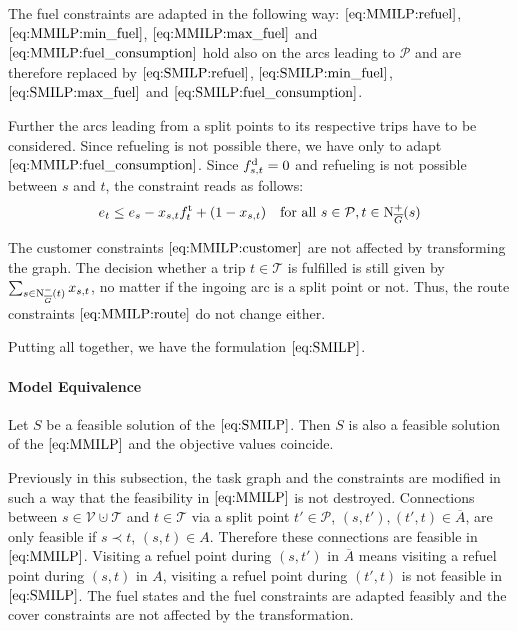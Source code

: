 The fuel constraints are adapted in the following way: $\eqref{eq:MMILP:refuel}$, $\eqref{eq:MMILP:min_fuel}$, $\eqref{eq:MMILP:max_fuel}$ and $\eqref{eq:MMILP:fuel_consumption}$ hold also on the arcs leading to $\mathcal{P}$ and are therefore replaced by $\eqref{eq:SMILP:refuel}$, $\eqref{eq:SMILP:min_fuel}$, $\eqref{eq:SMILP:max_fuel}$ and $\eqref{eq:SMILP:fuel_consumption}$.

Further the arcs leading from a split points to its respective trips have to be considered. Since refueling is not possible there, we have only to adapt $\eqref{eq:MMILP:fuel_consumption}$. Since $f^{\operatorname{d}}_{s,t} = 0$ and refueling is not possible between $s$ and $t$, the constraint reads as follows:
\begin{align}
	e_t \leq e_s - x_{s,t}f^{\operatorname{t}}_t + \left(1-x_{s,t}\right) && \text{for all } s\in \mathcal{P},t\in\operatorname{N}_{\overline{G}}^+(s) \label{eq:SMILP:fuel_splitpoint}
\end{align}

The customer constraints $\eqref{eq:MMILP:customer}$ are not affected by transforming the graph. The decision whether a trip $t\in\mathcal{T}$ is fulfilled is still given by $\sum_{s\in\operatorname{N}_{\overline{G}}^-(t)} x_{s,t}$, no matter if the ingoing arc is a split point or not. Thus, the route constraints $\eqref{eq:MMILP:route}$ do not change either.

Putting all together, we have the formulation $\eqref{eq:SMILP}$.

\paragraph{Model Equivalence} \parfill

\begin{theorem}

Let $S$ be a feasible solution of the $\eqref{eq:SMILP}$. Then $S$ is also a feasible solution of the $\eqref{eq:MMILP}$ and the objective values coincide.

\end{theorem}

Previously in this subsection, the task graph and the constraints are modified in such a way that the feasibility in $\eqref{eq:MMILP}$ is not destroyed. Connections between ${s\in\mathcal{V}\cupdot\mathcal{T}}$ and ${t\in\mathcal{T}}$ via a split point ${t'\in\mathcal{P}}$, \ie ${(s,t'),(t',t)\in\overline{A}}$, are only feasible if ${s\prec t}$, \ie ${(s,t)\in A}$. Therefore these connections are feasible in $\eqref{eq:MMILP}$. Visiting a refuel point during $\left(s,t'\right)$ in $\overline{A}$ means visiting a refuel point during $(s,t)$ in $A$, visiting a refuel point during $\left(t',t\right)$ is not feasible in $\eqref{eq:SMILP}$. The fuel states and the fuel constraints are adapted feasibly and the cover constraints are not affected by the transformation.


